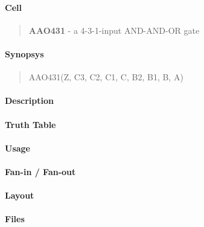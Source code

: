 \label{AAO431}
\paragraph{Cell}
\begin{quote}
    \textbf{AAO431} - a 4-3-1-input AND-AND-OR gate
\end{quote}

\paragraph{Synopsys}
\begin{quote}
    AAO431(Z, C3, C2, C1, C, B2, B1, B, A)
\end{quote}

\paragraph{Description}

%

\paragraph{Truth Table}
%

\paragraph{Usage}

\paragraph{Fan-in / Fan-out}

\paragraph{Layout}

\paragraph{Files}
